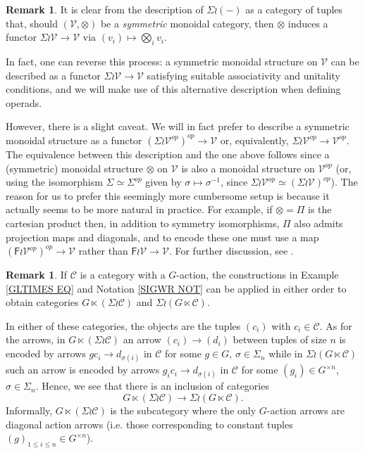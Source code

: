 \documentclass[a4paper,10pt
]{article}%
\numberwithin{equation}{section}
\numberwithin{figure}{section}
\theoremstyle{definition} %
\newtheorem{remark}[equation]{Remark}%
\newcommand{\V}{\ensuremath{\mathcal V}}
\newcommand{\C}{\ensuremath{\mathcal C}}
\newcommand{\1}{\ensuremath{\mathbbm 1}}%
\begin{document}
\begin{remark}
	It is clear from the description
	of $\Sigma \wr (-)$
	as a category of tuples that, 
	should $(\V,\otimes)$ be a \emph{symmetric} monoidal category,
	then $\otimes$
	induces a functor
	$\Sigma \wr \V \to \mathcal{V}$
	via $(v_i) \mapsto \bigotimes_i v_i$.
	
	In fact, one can reverse this process: a symmetric monoidal structure on $\V$ can be described as a functor
	$\Sigma \wr \V \to \V$
	satisfying suitable associativity and unitality conditions, and we will make use of this alternative description when defining operads.
	
	However, there is a slight caveat. 
	We will in fact prefer to describe a symmetric monoidal structure
	as a functor
	$\left(\Sigma \wr \V^{op}\right)^{op} \to \V$
	or, equivalently, 
	$\Sigma \wr \V^{op} \to \V^{op}$.
	The equivalence between this description and the one above
	follows since a (symmetric) monoidal structure $\otimes$ on $\V$ is also a monoidal structure on $\V^{op}$
	(or, using the isomorphism
	$\Sigma \simeq \Sigma^{op}$ given by $\sigma \mapsto \sigma^{-1}$,
	since $\Sigma \wr \V^{op} \simeq \left(\Sigma \wr \V \right)^{op}$).
	The reason for us to prefer this seemingly more cumbersome setup is because it actually seems to be more natural in practice.
	For example, if $\otimes = \Pi$ is the cartesian product then,
	in addition to symmetry isomorphisms, 
	$\Pi$ also admits projection maps and diagonals,
	and to encode these one must use a map
	$\left(\mathsf{F} \wr \mathcal{V}^{op}\right)^{op} \to \mathcal{V}$
	rather than
	$\mathsf{F} \wr \mathcal{V} \to \mathcal{V}$.
        For further discussion, see \cite[\S 2.2]{BP21}.
\end{remark}




\begin{remark}\label{WRDIAG REM}
	If $\mathcal{C}$ is a category with a $G$-action,
	the constructions in 
	Example \ref{GLTIMES EQ} and Notation \ref{SIGWR NOT}	
	can be applied in either order to obtain categories
	$G \ltimes (\Sigma \wr \mathcal{C})$
	and
	$\Sigma \wr (G \ltimes \mathcal{C})$.
	
	In either of these categories, the objects are the tuples
	$(c_i)$ with $c_i \in \mathcal{C}$.
	As for the arrows,
	in $G \ltimes (\Sigma \wr \mathcal{C})$
	an arrow $(c_i) \to (d_i)$
	between tuples of size $n$ is encoded by arrows 
	$gc_i \to d_{\sigma(i)}$
	in $\C$ for some $g\in G$, $\sigma \in \Sigma_n$
	while in $\Sigma \wr (G \ltimes \mathcal{C})$
	such an arrow is encoded by arrows
	$g_i c_i \to d_{\sigma(i)}$
	in $\C$ for some $(g_i) \in G^{\times n}$, $\sigma \in \Sigma_n$.
	Hence, we see that there is an inclusion of categories
	\begin{equation} 
	G \ltimes (\Sigma \wr \mathcal C) \to \Sigma \wr (G \ltimes \mathcal C).
	\end{equation}
	Informally, $G \ltimes (\Sigma \wr \mathcal C)$
	is the subcategory where the only
	$G$-action arrows are diagonal action arrows
	(i.e. those corresponding to constant tuples $(g)_{1 \leq i \leq n} \in G^{\times n}$).
\end{remark}
\end{document}
